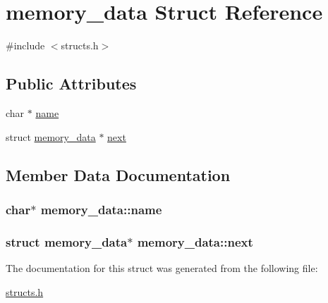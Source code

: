 \hypertarget{structmemory__data}{\section{memory\-\_\-data Struct Reference}
\label{structmemory__data}
}


{\ttfamily \#include $<$structs.\-h$>$}

\subsection*{Public Attributes}
\begin{DoxyCompactItemize}
\item 
char $\ast$ \hyperlink{structmemory__data_acf128d24cf05938665fd25f4b4472ec0}{name}
\item 
struct \hyperlink{structmemory__data}{memory\-\_\-data} $\ast$ \hyperlink{structmemory__data_a065d90866d17949da35e51037de8fe6d}{next}
\end{DoxyCompactItemize}


\subsection{Member Data Documentation}
\hypertarget{structmemory__data_acf128d24cf05938665fd25f4b4472ec0}{
\subsubsection[{name}]{\setlength{\rightskip}{0pt plus 5cm}char$\ast$ memory\-\_\-data\-::name}}\label{structmemory__data_acf128d24cf05938665fd25f4b4472ec0}
\hypertarget{structmemory__data_a065d90866d17949da35e51037de8fe6d}{
\subsubsection[{next}]{\setlength{\rightskip}{0pt plus 5cm}struct {\bf memory\-\_\-data}$\ast$ memory\-\_\-data\-::next}}\label{structmemory__data_a065d90866d17949da35e51037de8fe6d}


The documentation for this struct was generated from the following file\-:\begin{DoxyCompactItemize}
\item 
\hyperlink{structs_8h}{structs.\-h}\end{DoxyCompactItemize}
